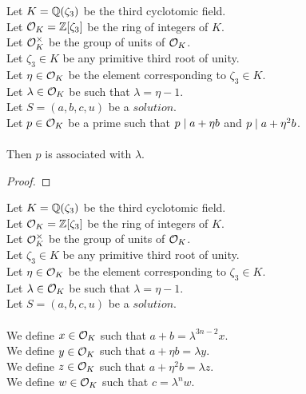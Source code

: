 \begin{lemma}
    \label{lmm:associated_of_dvd_a_add_eta_mul_b_of_dvd_a_add_eta_sq_mul_b}
    \leanok
    Let $K = \mathbb{Q}(\zeta_3)$ be the third cyclotomic field. \\
    Let $\mathcal{O}_K = \mathbb{Z}[\zeta_3]$ be the ring of integers of $K$. \\
    Let $\mathcal{O}^\times_K$ be the group of units of $\mathcal{O}_K$. \\
    Let $\zeta_3 \in K$ be any primitive third root of unity. \\
    Let $\eta \in \mathcal{O}_K$ be the element corresponding to $\zeta_3 \in K$. \\
    Let $\lambda \in \mathcal{O}_K$ be such that $\lambda = \eta -1$. \\
    Let $S=(a, b, c, u)$ be a $solution$.\\
    Let $p \in \mathcal{O}_K$ be a prime such that $p \mid a+\eta b$
    and $p \mid a+\eta^2  b$.\\\\
    Then $p$ is associated with $\lambda$.
\end{lemma}
\begin{proof}
    \leanok
\end{proof}

\begin{definition}[$x,y,z,w$]
    \label{def:Solution_x_y_z_w}
    \leanok
    Let $K = \mathbb{Q}(\zeta_3)$ be the third cyclotomic field. \\
    Let $\mathcal{O}_K = \mathbb{Z}[\zeta_3]$ be the ring of integers of $K$. \\
    Let $\mathcal{O}^\times_K$ be the group of units of $\mathcal{O}_K$. \\
    Let $\zeta_3 \in K$ be any primitive third root of unity. \\
    Let $\eta \in \mathcal{O}_K$ be the element corresponding to $\zeta_3 \in K$. \\
    Let $\lambda \in \mathcal{O}_K$ be such that $\lambda = \eta -1$. \\
    Let $S=(a, b, c, u)$ be a $solution$.\\\\
    We define $x \in \mathcal{O}_K$ such that $a + b = \lambda^{3n-2}  x$.\\
    We define $y \in \mathcal{O}_K$ such that $a + \eta  b = \lambda  y$.\\
    We define $z \in \mathcal{O}_K$ such that $a + \eta^2  b = \lambda  z$.\\
    We define $w \in \mathcal{O}_K$ such that $c = \lambda^n  w$.
\end{definition}

